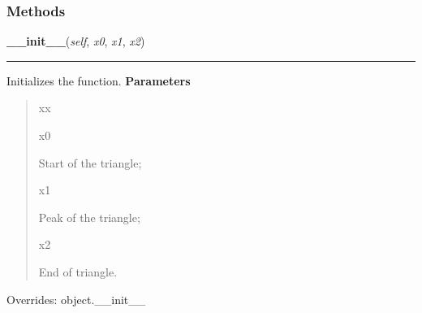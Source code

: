 
  \subsubsection{Methods}

    \vspace{0.5ex}

\hspace{.8\funcindent}\begin{boxedminipage}{\funcwidth}

    \raggedright \textbf{\_\_init\_\_}(\textit{self}, \textit{x0}, \textit{x1}, \textit{x2})

    \vspace{-1.5ex}

    \rule{\textwidth}{0.5\fboxrule}
\setlength{\parskip}{2ex}

Initializes the function.
\setlength{\parskip}{1ex}
      \textbf{Parameters}
      \vspace{-1ex}

      \begin{quote}
        \begin{Ventry}{xx}

          \item[x0]


Start of the triangle;
          \item[x1]


Peak of the triangle;
          \item[x2]


End of triangle.
        \end{Ventry}

      \end{quote}

      Overrides: object.\_\_init\_\_

    \end{boxedminipage}

    \vspace{0.5ex}

